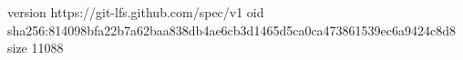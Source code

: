 version https://git-lfs.github.com/spec/v1
oid sha256:814098bfa22b7a62baa838db4ae6cb3d1465d5ca0ca473861539ec6a9424c8d8
size 11088
